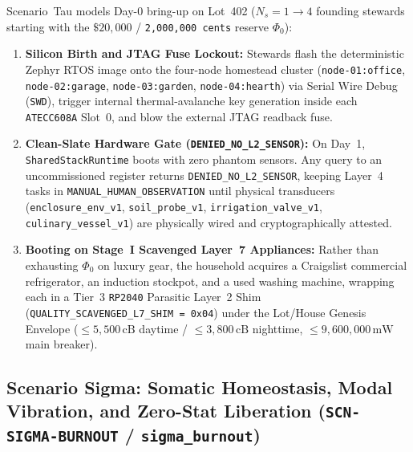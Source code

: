 Scenario~Tau models Day-0 bring-up on Lot~402 ($N_s = 1 \to 4$ founding stewards starting with the $\$20{,}000$ / \texttt{2,000,000 cents} reserve $\Phi_0$):
\begin{enumerate}
    \item \textbf{Silicon Birth and JTAG Fuse Lockout:} Stewards flash the deterministic Zephyr RTOS image onto the four-node homestead cluster (\texttt{node-01:office}, \texttt{node-02:garage}, \texttt{node-03:garden}, \texttt{node-04:hearth}) via Serial Wire Debug (\texttt{SWD}), trigger internal thermal-avalanche key generation inside each \texttt{ATECC608A} Slot~0, and blow the external JTAG readback fuse.
    \item \textbf{Clean-Slate Hardware Gate (\texttt{DENIED\_NO\_L2\_SENSOR}):} On Day~1, \texttt{SharedStackRuntime} boots with zero phantom sensors. Any query to an uncommissioned register returns \texttt{DENIED\_NO\_L2\_SENSOR}, keeping Layer~4 tasks in \texttt{MANUAL\_HUMAN\_OBSERVATION} until physical transducers (\texttt{enclosure\_env\_v1}, \texttt{soil\_probe\_v1}, \texttt{irrigation\_valve\_v1}, \texttt{culinary\_vessel\_v1}) are physically wired and cryptographically attested.
    \item \textbf{Booting on Stage~I Scavenged Layer~7 Appliances:} Rather than exhausting $\Phi_0$ on luxury gear, the household acquires a Craigslist commercial refrigerator, an induction stockpot, and a used washing machine, wrapping each in a Tier~3 \texttt{RP2040} Parasitic Layer~2 Shim (\texttt{QUALITY\_SCAVENGED\_L7\_SHIM = 0x04}) under the Lot/House Genesis Envelope ($\le 5{,}500\,\mathrm{cB}$ daytime / $\le 3{,}800\,\mathrm{cB}$ nighttime, $\le 9{,}600{,}000\,\mathrm{mW}$ main breaker).
\end{enumerate}

\subsection{Scenario Sigma: Somatic Homeostasis, Modal Vibration, and Zero-Stat Liberation (\texttt{SCN-SIGMA-BURNOUT} / \texttt{sigma\_burnout})}

